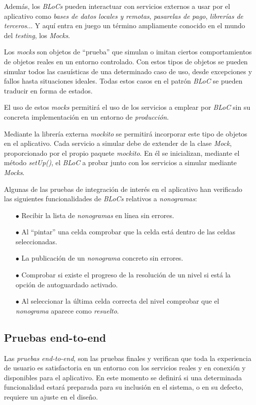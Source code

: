  Además, los \textit{BLoCs} pueden interactuar con servicios externos a usar por el aplicativo como \textit{bases de datos locales y remotas},
 \textit{pasarelas de pago}, \textit{librerías de terceros}... Y aquí entra en juego un término ampliamente conocido en el mundo del  \textit{testing},
 los \textit{Mocks}.

 Los \textit{mocks} son objetos de ``prueba'' que simulan o imitan ciertos comportamientos
 de objetos reales en un entorno controlado. Con estos tipos de objetos se pueden simular
 todos las casuísticas de una determinado caso de uso, desde excepciones y fallos hasta situaciones
 ideales.
 Todas estos casos en el patrón \textit{BLoC} se pueden traducir en forma de estados.

 El uso de estos \textit{mocks} permitirá el uso de los servicios a emplear por \textit{BLoC} sin
 su concreta implementación en un entorno de \textit{producción}.
 
 Mediante la librería externa \textit{mockito} se permitirá incorporar este tipo de objetos
 en el aplicativo. Cada servicio a simular debe de
 extender de la clase \textit{Mock}, proporcionado por el propio paquete \textit{mockito}.
 En él se inicializan, mediante el método \textit{setUp()}, el \textit{BLoC} a probar junto con
 los servicios a simular mediante \textit{Mocks}.

 Algunas de las pruebas de integración de interés en el aplicativo han verificado las
 siguientes funcionalidades de \textit{BLoCs} relativos a \textit{nonogramas}:

 \begin{itemize}
    \item[$\bullet$] Recibir la lista de \textit{nonogramas} en línea sin errores.
    \item[$\bullet$] Al ``pintar'' una celda comprobar que la celda está dentro de las celdas seleccionadas.
    \item[$\bullet$] La publicación de un \textit{nonograma} concreto sin errores.
    \item[$\bullet$] Comprobar si existe el progreso de la resolución de un nivel si está la opción
    de autoguardado activado.  
    \item[$\bullet$] Al seleccionar la última celda correcta del nivel comprobar que el \textit{nonograma}
    aparece como \textit{resuelto}. 
 \end{itemize}

 \subsection{Pruebas end-to-end}
 Las \textit{pruebas end-to-end}, son las pruebas finales y verifican que
 toda la experiencia de usuario es satisfactoria en un entorno con los servicios reales
 y en conexión y disponibles para el aplicativo. En este momento se definirá si una
 determinada funcionalidad estará preparada para su inclusión en el sistema,
 o en su defecto, requiere un ajuste en el diseño.

